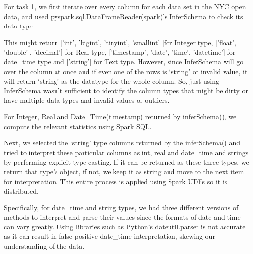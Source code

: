 \documentclass[sigconf,authordraft]{acmart}
\begin{document}
For task 1, we first iterate over every column for each data set in the NYC open data, and used
pyspark.sql.DataFrameReader(spark)’s InferSchema to check its data type.


This might return ['int', 'bigint', 'tinyint', 'smallint' ]for Integer type, ['float', 'double' , 'decimal'] for
Real type, ['timestamp', 'date', 'time', 'datetime'] for date\_time type and ['string'] for Text type.
However, since InferSchema will go over the column at once and if even one of the rows is ‘string’
or invalid value, it will return ‘string’ as the datatype for the whole column. So, just using
InferSchema wasn’t sufficient to identify the column types that might be dirty or have multiple
data types and invalid values or outliers.

For Integer, Real and Date\_Time(timestamp) returned by inferSchema(), we compute the relevant
statistics using Spark SQL.

Next, we selected the ‘string’ type columns returned by the inferSchema() and tried to
interpret these particular columns as int, real and date\_time and strings by performing explicit type
casting. If it can be returned as these three types, we return that type’s object, if not, we keep it as
string and move to the next item for interpretation. This entire process is applied using Spark UDFs
so it is distributed. 

Specifically, for date\_time and string types, we had three different versions of methods to interpret
and parse their values since the formats of date and time can vary greatly. Using libraries
such as Python’s dateutil.parser is not accurate as it can result in false positive date\_time
interpretation, skewing our understanding of the data.
\end{document}
